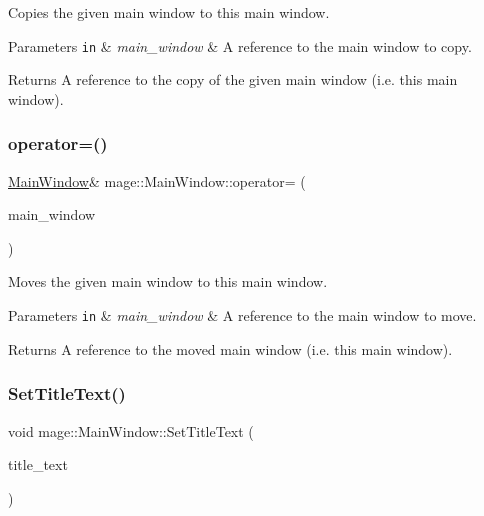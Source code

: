 Copies the given main window to this main window.


\begin{DoxyParams}[1]{Parameters}
\mbox{\tt in}  & {\em main\+\_\+window} & A reference to the main window to copy. \\
\hline
\end{DoxyParams}
\begin{DoxyReturn}{Returns}
A reference to the copy of the given main window (i.\+e. this main window). 
\end{DoxyReturn}
\hypertarget{classmage_1_1_main_window_a684d547966f69ef5df793b5ce516f76a}{}\label{classmage_1_1_main_window_a684d547966f69ef5df793b5ce516f76a} 
\subsubsection{\texorpdfstring{operator=()}{operator=()}\hspace{0.1cm}{\footnotesize\ttfamily [2/2]}}
{\footnotesize\ttfamily \hyperlink{classmage_1_1_main_window}{Main\+Window}\& mage\+::\+Main\+Window\+::operator= (\begin{DoxyParamCaption}\item[{\hyperlink{classmage_1_1_main_window}{Main\+Window} \&\&}]{main\+\_\+window }\end{DoxyParamCaption})\hspace{0.3cm}{\ttfamily [delete]}}

Moves the given main window to this main window.


\begin{DoxyParams}[1]{Parameters}
\mbox{\tt in}  & {\em main\+\_\+window} & A reference to the main window to move. \\
\hline
\end{DoxyParams}
\begin{DoxyReturn}{Returns}
A reference to the moved main window (i.\+e. this main window). 
\end{DoxyReturn}
\hypertarget{classmage_1_1_main_window_aaadd51dc2b902d93ea2f28d685477301}{}\label{classmage_1_1_main_window_aaadd51dc2b902d93ea2f28d685477301} 
\subsubsection{\texorpdfstring{Set\+Title\+Text()}{SetTitleText()}\hspace{0.1cm}{\footnotesize\ttfamily [1/2]}}
{\footnotesize\ttfamily void mage\+::\+Main\+Window\+::\+Set\+Title\+Text (\begin{DoxyParamCaption}\item[{const wstring \&}]{title\+\_\+text }\end{DoxyParamCaption})\hspace{0.3cm}{\ttfamily [noexcept]}}

